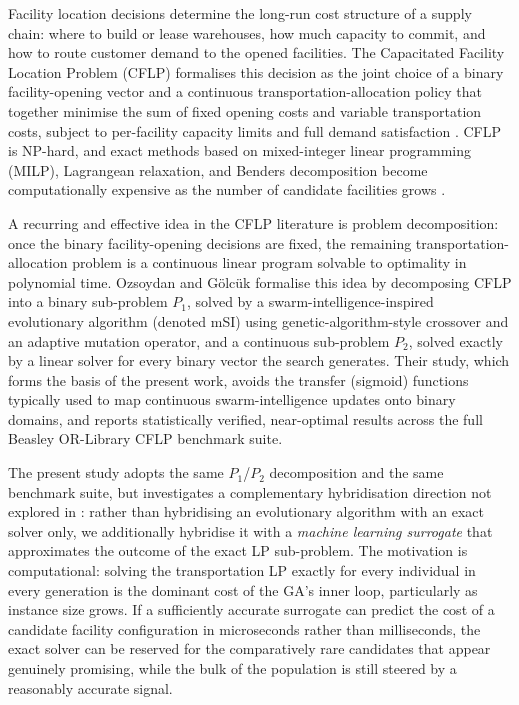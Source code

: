 \documentclass[conference]{IEEEtran}
\begin{document}
Facility location decisions determine the long-run cost structure of a supply
chain: where to build or lease warehouses, how much capacity to commit, and
how to route customer demand to the opened facilities. The Capacitated
Facility Location Problem (CFLP) formalises this decision as the joint choice
of a binary facility-opening vector and a continuous transportation-allocation
policy that together minimise the sum of fixed opening costs and variable
transportation costs, subject to per-facility capacity limits and full demand
satisfaction \citep{beasley1988,contreras2010}. CFLP is NP-hard, and exact
methods based on mixed-integer linear programming (MILP), Lagrangean
relaxation, and Benders decomposition become computationally expensive as the
number of candidate facilities grows \citep{fischetti2016,vanroy1986}.

A recurring and effective idea in the CFLP literature is problem decomposition:
once the binary facility-opening decisions are fixed, the remaining
transportation-allocation problem is a continuous linear program solvable to
optimality in polynomial time. Ozsoydan and G\"{o}lc\"{u}k \citep{ozsoydan2023}
formalise this idea by decomposing CFLP into a binary sub-problem $P_1$,
solved by a swarm-intelligence-inspired evolutionary algorithm (denoted mSI)
using genetic-algorithm-style crossover and an adaptive mutation operator, and
a continuous sub-problem $P_2$, solved exactly by a linear solver for every
binary vector the search generates. Their study, which forms the basis of the
present work, avoids the transfer (sigmoid) functions typically used to map
continuous swarm-intelligence updates onto binary domains, and reports
statistically verified, near-optimal results across the full Beasley
OR-Library CFLP benchmark suite.

The present study adopts the same $P_1$/$P_2$ decomposition and the same
benchmark suite, but investigates a complementary hybridisation direction not
explored in \citep{ozsoydan2023}: rather than hybridising an evolutionary
algorithm with an exact solver only, we additionally hybridise it with a
\emph{machine learning surrogate} that approximates the outcome of the exact
LP sub-problem. The motivation is computational: solving the transportation LP
exactly for every individual in every generation is the dominant cost of the
GA's inner loop, particularly as instance size grows. If a sufficiently
accurate surrogate can predict the cost of a candidate facility configuration
in microseconds rather than milliseconds, the exact solver can be reserved
for the comparatively rare candidates that appear genuinely promising, while
the bulk of the population is still steered by a reasonably accurate signal.
\end{document}
